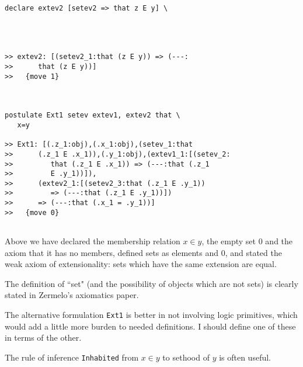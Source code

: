 \documentclass[12pt]{article}
\begin{document}
\begin{verbatim}
declare extev2 [setev2 => that z E y] \
   



>> extev2: [(setev2_1:that (z E y)) => (---:
>>      that (z E y))]
>>   {move 1}



postulate Ext1 setev extev1, extev2 that \
   x=y

>> Ext1: [(.z_1:obj),(.x_1:obj),(setev_1:that
>>      (.z_1 E .x_1)),(.y_1:obj),(extev1_1:[(setev_2:
>>         that (.z_1 E .x_1)) => (---:that (.z_1
>>         E .y_1))]),
>>      (extev2_1:[(setev2_3:that (.z_1 E .y_1))
>>         => (---:that (.z_1 E .y_1))])
>>      => (---:that (.x_1 = .y_1))]
>>   {move 0}


\end{verbatim}

Above we have declared the membership relation $x \in y$, the empty set 0 and the axiom that it has no members, defined sets as elements and 0, and stated the weak axiom of extensionality:  sets which have the same extension are equal.

The definition of ``set" (and the possibility of objects which are not sets) is clearly stated in Zermelo's axiomatics paper.

The alternative formulation {\tt Ext1} is better in not involving logic primitives, which would add a little more burden to needed definitions.  I should define one of these in terms of the other.

The  rule of inference {\tt Inhabited} from $x \in y$ to sethood of $y$ is often useful.
\end{document}
